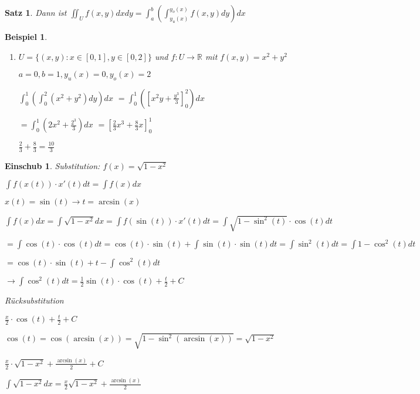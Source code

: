 \documentclass[fontset=ubuntu,11pt,a4paper,fleqn,headsepline]{scrreprt}
\newtheorem{beispiel}[defi]{Beispiel}
\newtheorem{satz}[defi]{Satz}
\newtheorem*{einschub}{Einschub}
\begin{document}
\begin{multicols}{2}
\begin{satz}
            Dann ist \(\iint_U f(x,y)dxdy = \int^b_a \left(\int^{y_o(x)}_{y_u(x)} f(x,y)dy\right)dx\)
        \end{satz}
    
        \begin{beispiel}
            \begin{enumerate}[label=\emph{(\roman*)}]
    
                \item \(U=\{(x,y):x \in [0,1], y \in [0,2]\}\) und \(f:U\to\mathbb{R}\) mit \(f(x,y)=x^2+y^2\)
    
                    \(a=0,b=1,y_u(x)=0,y_o(x)=2\)
                   
                    \(\int^1_0 \left(\int^{2}_{0} (x^2+y^2)dy\right)dx\)
                    \(=\int^1_0 \left({\left[x^2y+\frac{y^3}{3}\right]}^{2}_{0}\right)dx\)

                    \(=\int^1_0 \left(2x^2+\frac{2^3}{3}\right)dx\)
                    \(={\left[\frac{2}{3}x^3+\frac{8}{3}x\right]}^1_0\)

                    \(\frac{2}{3}+\frac{8}{3}=\frac{10}{3}\)
            \end{enumerate}
        \end{beispiel}
        \begin{einschub}
            Substitution: \(f(x)=\sqrt{1-x^2}\)

            \(\int f(x(t))\cdot x'(t)dt=\int f(x)dx\)
            
            \(x(t)=\sin(t) \to t=\arcsin(x)\)

            \(\int f(x)dx=\int \sqrt{1-x^2}dx=\int f(\sin(t))\cdot x'(t)dt=\int \sqrt{1-\sin^2(t)}\cdot\cos(t)dt\)

            \(=\int \cos(t)\cdot\cos(t)dt=\cos(t)\cdot\sin(t)+\int \sin(t)\cdot\sin(t)dt=\int \sin^2(t)dt=\int 1-\cos^2(t)dt\)

            \(=\cos(t)\cdot\sin(t)+t-\int \cos^2(t)dt\)

            \(\to \int \cos^2(t)dt=\frac{1}{2}\sin(t)\cdot\cos(t)+\frac{t}{2}+C\)

            Rücksubstitution

            \(\frac{x}{2}\cdot\cos(t)+\frac{t}{2}+C\)

            \(\cos(t)=\cos(\arcsin(x))=\sqrt{1-\sin^2(\arcsin(x))}=\sqrt{1-x^2}\)

            \(\frac{x}{2}\cdot\sqrt{1-x^2}+\frac{\arcsin(x)}{2}+C\)

            \(\int \sqrt{1-x^2}dx=\frac{x}{2}\sqrt{1-x^2}+\frac{\arcsin(x)}{2}\)
        \end{einschub}
    

\end{multicols}
\end{document}
